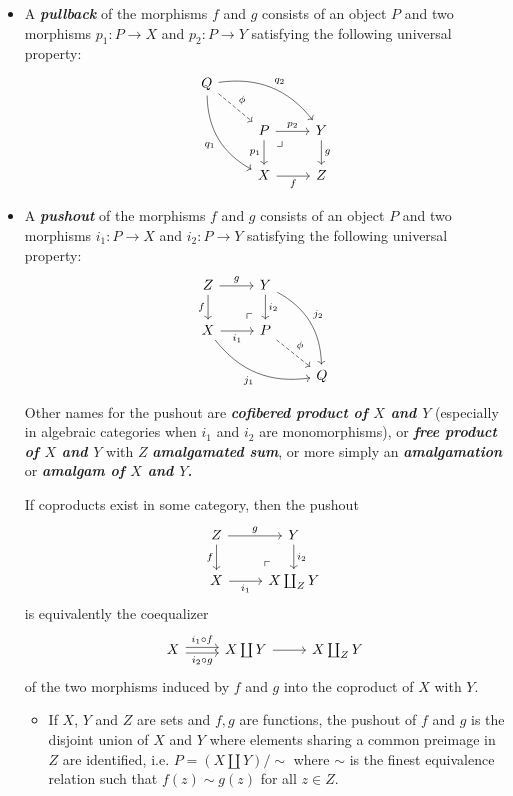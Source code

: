 \documentclass{article}
\begin{document}
\begin{defn}
\begin{itemize}
		\item A \textbf{\textit{pullback}} of the morphisms $f$ and $g$ consists of an object $P$ and two morphisms $p_1:P\to X$ and $p_2:P\to Y$ satisfying the following universal property:
		\[\begin{tikzcd}
			Q\arrow[rrd,bend left,"q_2"]\arrow[ddr,"q_1",swap,bend right]\arrow[dr,dashed,"\phi"]\\
			&P\arrow[r,"p_2"] \arrow[rd, phantom, "\lrcorner", very near start]\arrow[d,"p_1",swap]&Y\arrow[d,"g"]\\
			&X\arrow[r,"f",swap]&Z
		\end{tikzcd}\]
		\item A \textbf{\textit{pushout}} of the morphisms $f$ and $g$ consists of an object $P$ and two morphisms $i_1:P\to X$ and $i_2:P\to Y$ satisfying the following universal property:
		\[\begin{tikzcd}
			Z\arrow[r,"g"]\arrow[d,swap,"f"]&Y\arrow[d,"i_2"]\arrow[ddr,bend left,"j_2"]\\
			X\arrow[r,"i_1",swap]\arrow[drr,bend right,swap,"j_1"]&P\arrow[ul, phantom, "\ulcorner", very near start]\arrow[dr,dashed,"\phi"]\\
			&&Q
		\end{tikzcd}\]
		\begin{remark}
			Other names for the pushout are \textbf{\textit{cofibered product of $X$ and $Y$}} (especially in algebraic categories when $i_1$ and $i_2$ are monomorphisms), or \textbf{\textit{free product of $X$ and $Y$}} with $Z$ \textbf{\textit{amalgamated sum}}, or more simply an \textbf{\textit{amalgamation}} or \textbf{\textit{amalgam of $X$ and $Y$.}}
		\end{remark}
		\begin{remark}
			If coproducts exist in some category, then the pushout 
			\[\begin{tikzcd}
				Z\arrow[r,"g"]\arrow[d,swap,"f"]&Y\arrow[d,"i_2"]\\
				X\arrow[r,"i_1",swap]&X\coprod_Z Y\arrow[ul, phantom, "\ulcorner", very near start]
			\end{tikzcd}\]
			is equivalently the coequalizer 
			\[\begin{tikzcd}
				X\arrow[r,shift={(0,0.07)},"i_1\circ f"]\arrow[r,shift={(0,-0.07)},"i_2\circ g",swap]&X\coprod Y\arrow[r]&X\coprod_Z Y
			\end{tikzcd}\]
			of the two morphisms induced by $f$ and $g$ into the coproduct of $X$ with $Y$.
		\end{remark}
		\begin{example}\leavevmode
			\begin{itemize}
				\item If $X$, $Y$ and $Z$ are sets and $f,g$ are functions, the pushout of $f$ and $g$ is the disjoint union of $X$ and $Y$ where elements sharing a common preimage in $Z$ are identified, i.e. $P=\left(X\coprod Y\right)/\sim$ where $\sim$ is the finest equivalence relation such that $f(z)\sim g(z)$ for all $z\in Z$.
			

\end{itemize}
\end{example}
\end{itemize}
\end{defn}
\end{document}
